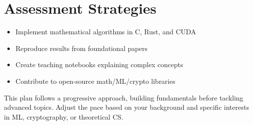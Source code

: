 \documentclass{article}
\begin{document}
\section{Assessment Strategies}

\begin{itemize}[leftmargin=*]
    \item Implement mathematical algorithms in C, Rust, and CUDA
    \item Reproduce results from foundational papers
    \item Create teaching notebooks explaining complex concepts
    \item Contribute to open-source math/ML/crypto libraries
\end{itemize}

\vspace{1cm}
\noindent This plan follows a progressive approach, building fundamentals before tackling advanced topics. Adjust the pace based on your background and specific interests in ML, cryptography, or theoretical CS.
\end{document}
